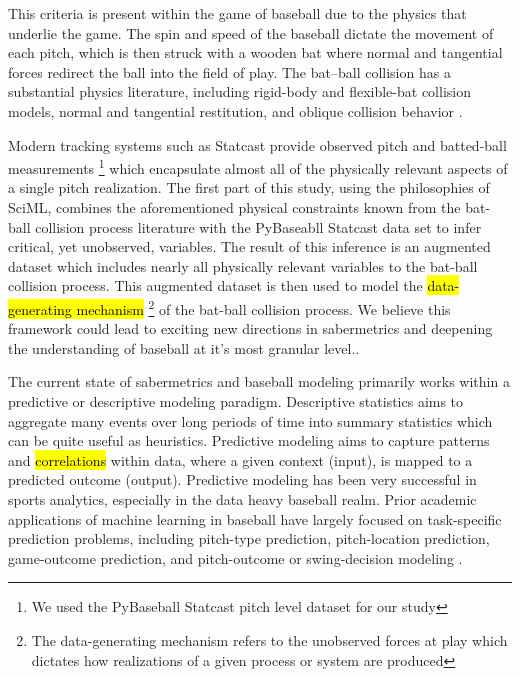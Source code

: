 \documentclass[11pt]{article}
\begin{document}
This criteria is present within the game of baseball due to the physics that underlie the game. The spin and speed of the baseball dictate the movement of each pitch, which is then struck with a wooden bat where normal and tangential forces redirect the ball into the field of play. The bat--ball collision has a substantial physics literature, including rigid-body and flexible-bat collision models, normal and tangential restitution, and oblique collision behavior \citep{cross1999impact, nathan2000dynamics, nathan2003characterizing, cross2006scattering, kensrud2017oblique}. 

Modern tracking systems such as Statcast provide observed pitch and batted-ball measurements \footnote{We used the PyBaseball Statcast pitch level dataset for our study} which encapsulate almost all of the physically relevant aspects of a single pitch realization. The first part of this study, using the philosophies of SciML, combines the aforementioned physical constraints known from the bat-ball collision process literature with the PyBaseabll Statcast data set to infer critical, yet unobserved, variables. The result of this inference is an augmented dataset which includes nearly all physically relevant variables to the bat-ball collision process. This augmented dataset is then used to model the \hl{data-generating mechanism} \footnote{The data-generating mechanism refers to the unobserved forces at play which dictates how realizations of a given process or system are produced} of the bat-ball collision process. We believe this framework could lead to exciting new directions in sabermetrics and deepening the understanding of baseball at it's most granular level.\citep{kagan2017Statcast}. 

The current state of sabermetrics and baseball modeling primarily works within a predictive or descriptive modeling paradigm. Descriptive statistics aims to aggregate many events over long periods of time into summary statistics which can be quite useful as heuristics. Predictive modeling aims to capture patterns and \hl{correlations} within data, where a given context (input), is mapped to a predicted outcome (output). Predictive modeling has been very successful in sports analytics, especially in the data heavy baseball realm. Prior academic applications of machine learning in baseball have largely focused on task-specific prediction problems, including pitch-type prediction, pitch-location prediction, game-outcome prediction, and pitch-outcome or swing-decision modeling \citep{hamilton2014applying, hoang2015dynamic, sidle2018using, lee2022prediction, yu2022decide, huang2021use, gopal2024baseball}.
\end{document}
